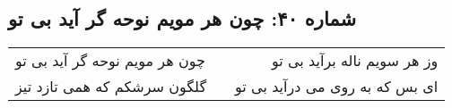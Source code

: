 \begin{center}
\section*{شماره ۴۰: چون هر مویم نوحه گر آید بی تو}
\label{sec:040}
\begin{longtable}{l p{0.5cm} r}
چون هر مویم نوحه گر آید بی تو
&&
وز هر سویم ناله برآید بی تو
\\
گلگون سرشکم که همی تازد تیز
&&
ای بس که به روی می درآید بی تو
\\
\end{longtable}
\end{center}
